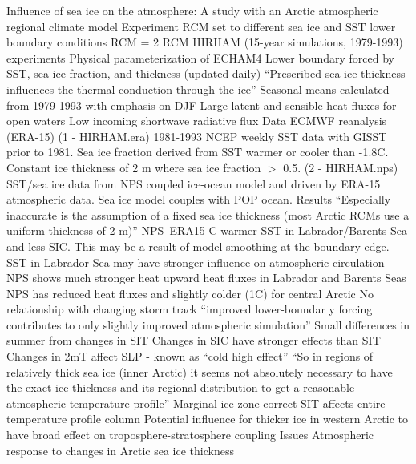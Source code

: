 \documentclass[12pt,fleqn]{article}
\begin{document}
\fancyhf{}


\begin{outline}[enumerate]
\1 Influence of sea ice on the atmosphere: A study with an Arctic atmospheric regional climate model \citep{Rinke2006}
	\2 Experiment
		\3 RCM set to different sea ice and SST lower boundary conditions
		\3 RCM = 2 RCM HIRHAM (15-year simulations, 1979-1993) experiments
			\4 Physical parameterization of ECHAM4
			\4 Lower boundary forced by SST, sea ice fraction, and thickness (updated daily)
			\4 ``Prescribed sea ice thickness influences the thermal conduction through the ice''
		\3 Seasonal means calculated from 1979-1993 with emphasis on DJF
			\4 Large latent and sensible heat fluxes for open waters
			\4 Low incoming shortwave radiative flux
	\2 Data
		\3 ECMWF reanalysis (ERA-15)
			\3 (1 - HIRHAM.era) 1981-1993 NCEP weekly SST data with GISST prior to 1981. Sea ice fraction derived from SST warmer or cooler than -1.8\degree C. Constant ice thickness of 2 m where sea ice fraction $>$ 0.5.
			\3 (2 - HIRHAM.nps) SST/sea ice data from NPS coupled ice-ocean model and driven by ERA-15 atmospheric data. Sea ice model couples with POP ocean.
	\2 Results
		\3 ``Especially inaccurate is the assumption of a fixed sea ice thickness (most Arctic RCMs use a uniform thickness of 2 m)''
		\3 NPS--ERA15
			\degree C warmer SST in Labrador/Barents Sea and less SIC. This may be a result of model smoothing at the boundary edge.
			\4 SST in Labrador Sea may have stronger influence on atmospheric circulation
			\4 NPS shows much stronger heat upward heat fluxes in Labrador and Barents Seas
			\4 NPS has reduced heat fluxes and slightly colder (1\degree C) for central Arctic
		\3 No relationship with changing storm track
		\3 ``improved lower-boundar
		y forcing contributes to only slightly improved atmospheric simulation''
		\3 Small differences in summer from changes in SIT
		\3 Changes in SIC have stronger effects than SIT
		\3 Changes in 2mT affect SLP - known as ``cold high effect''
		\3 ``So in regions of relatively thick sea ice (inner Arctic) it seems not absolutely necessary to have the exact ice thickness and its regional distribution to get a reasonable atmospheric temperature profile''
		\3 Marginal ice zone correct SIT affects entire temperature profile column
		\3 Potential influence for thicker ice in western Arctic to have broad effect on troposphere-stratosphere coupling
	\2 Issues
\1 Atmospheric response to changes in Arctic sea ice thickness \citep{Gerdes2006}

\end{outline}
\end{document}
